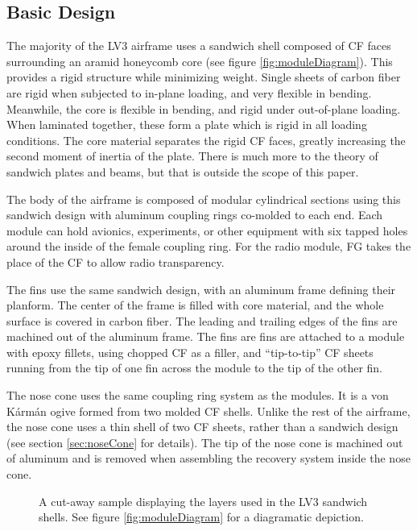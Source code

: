 \documentclass{aiaa-tc}%
\begin{document}
\subsection{Basic Design}

The majority of the LV3 airframe uses a sandwich shell composed of CF faces surrounding an aramid honeycomb core (see figure \ref{fig:moduleDiagram}). This provides a rigid structure while minimizing weight. 
Single sheets of carbon fiber are rigid when subjected to in-plane loading, and very flexible in bending. Meanwhile, the core is flexible in bending, and rigid under out-of-plane loading. 
When laminated together, these form a plate which is rigid in all loading conditions. The core material separates the rigid CF faces, greatly increasing the second moment of inertia of the plate. 
There is much more to the theory of sandwich plates and beams, but that is outside the scope of this paper. 

The body of the airframe is composed of modular cylindrical sections using this sandwich design with aluminum coupling rings co-molded to each end.
Each module can hold avionics, experiments, or other equipment with six tapped holes around the inside of the female coupling ring. 
For the radio module, FG takes the place of the CF to allow radio transparency.

The fins use the same sandwich design, with an aluminum frame defining their planform. The center of the frame is filled with core material, and the whole surface is covered in carbon fiber. 
The leading and trailing edges of the fins are machined out of the aluminum frame. 
The fins are fins are attached to a module with epoxy fillets, using chopped CF as a filler, and ``tip-to-tip'' CF sheets running from the tip of one fin across the module to the tip of the other fin.

The nose cone uses the same coupling ring system as the modules. It is a von K\'arm\'an ogive formed from two molded CF shells. 
Unlike the rest of the airframe, the nose cone uses a thin shell of two CF sheets, rather than a sandwich design (see section \ref{sec:noseCone} for details). 
The tip of the nose cone is machined out of aluminum and is removed when assembling the recovery system inside the nose cone. 

\begin{figure}
\centering
\def\svgwidth{\linewidth}
\parbox{0.45\linewidth}{
	
	\caption{
		Diagram of the male end of a module. 
		The CF (1) is bonded to the honeycomb core (3) and the aluminum coupling ring (4) using structural adhesive (2). 
		The adhesive also serves as a protective coating for the CF and provides a smooth outer surface. 
		See figure \ref{fig:coupon} for a picture of this design.
		}
	\label{fig:moduleDiagram}
}
\hfill
\parbox{0.45\linewidth}{
	
	\caption{
		A cut-away sample displaying the layers used in the LV3 sandwich shells. 
		See figure \ref{fig:moduleDiagram} for a diagramatic depiction.
		}
	\label{fig:coupon}
}
\end{figure}
\end{document}
